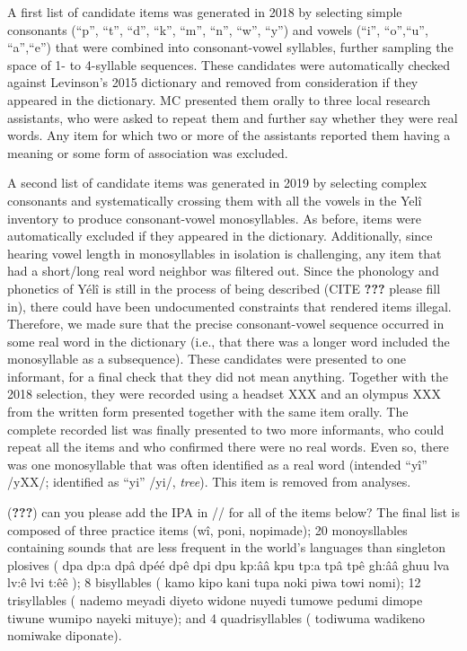 \documentclass[english,,man,floatsintext]{apa6}
\begin{document}
A first list of candidate items was generated in 2018 by selecting simple consonants (\enquote{p}, \enquote{t}, \enquote{d}, \enquote{k}, \enquote{m}, \enquote{n}, \enquote{w}, \enquote{y}) and vowels (\enquote{i}, \enquote{o},\enquote{u}, \enquote{a},\enquote{e}) that were combined into consonant-vowel syllables, further sampling the space of 1- to 4-syllable sequences. These candidates were automatically checked against Levinson's 2015 dictionary and removed from consideration if they appeared in the dictionary. MC presented them orally to three local research assistants, who were asked to repeat them and further say whether they were real words. Any item for which two or more of the assistants reported them having a meaning or some form of association was excluded.

A second list of candidate items was generated in 2019 by selecting complex consonants and systematically crossing them with all the vowels in the Yelî inventory to produce consonant-vowel monosyllables. As before, items were automatically excluded if they appeared in the dictionary. Additionally, since hearing vowel length in monosyllables in isolation is challenging, any item that had a short/long real word neighbor was filtered out. Since the phonology and phonetics of Yélî is still in the process of being described (CITE {\textbf{???}} please fill in), there could have been undocumented constraints that rendered items illegal. Therefore, we made sure that the precise consonant-vowel sequence occurred in some real word in the dictionary (i.e., that there was a longer word included the monosyllable as a subsequence). These candidates were presented to one informant, for a final check that they did not mean anything. Together with the 2018 selection, they were recorded using a headset XXX and an olympus XXX from the written form presented together with the same item orally. The complete recorded list was finally presented to two more informants, who could repeat all the items and who confirmed there were no real words. Even so, there was one monosyllable that was often identified as a real word (intended \enquote{yî} /yXX/; identified as \enquote{yi} /yi/, \emph{tree}). This item is removed from analyses.

({\textbf{???}}) can you please add the IPA in // for all of the items below?
The final list is composed of three practice items (wî, poni, nopimade); 20 monoysllables containing sounds that are less frequent in the world's languages than singleton plosives (
dpa
dp:a
dpâ
dpéé
dpê
dpi
dpu
kp:ââ
kpu
tp:a
tpâ
tpê
gh:ââ
ghuu
lva
lv:ê
lvi
t:êê
); 8 bisyllables (
kamo
kipo
kani
tupa
noki
piwa
towi
nomi);
12 trisyllables (
nademo
meyadi
diyeto
widone
nuyedi
tumowe
pedumi
dimope
tiwune
wumipo
nayeki
mituye); and 4 quadrisyllables (
todiwuma
wadikeno
nomiwake
diponate).
\end{document}
